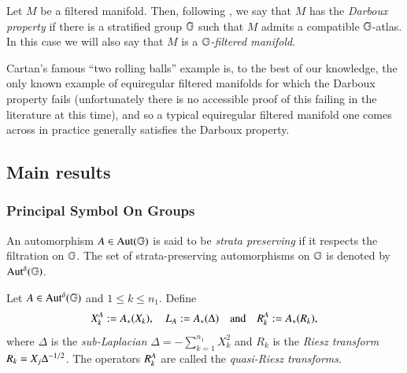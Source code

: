 \documentclass[leqno]{amsart}
\begin{document}
	\begin{definition}\label{G-filtered manifold}
		Let $M$ be a filtered manifold. Then, following \cite{MK2022}, we say that $M$ has the \textit{Darboux property} if there is a stratified group $\mathbb{G}$ such that $M$ admits a compatible $\mathbb{G}$-atlas. In this case we will also say that $M$ is a \textit{$\mathbb{G}$-filtered manifold}.
	\end{definition}
	
	Cartan's famous ``two rolling balls'' example \cite{balls} is, to the best of our knowledge, the only known example of equiregular filtered manifolds for which the Darboux property fails (unfortunately there is no accessible proof of this failing in the literature at this time), and so a typical equiregular filtered manifold one comes across in practice generally satisfies the Darboux property.
	
	
	\subsection{Main results}\label{main results}
	
	\subsubsection{Principal Symbol On Groups}
	
	
	\begin{definition}
		An automorphism $A\in\rm Aut(\mathbb{G})$ is said to be \textit{strata preserving} if it respects the filtration on $\mathbb{G}$. The set of strata-preserving automorphisms on $\mathbb{G}$ is denoted by ${\rm Aut^{\delta}}(\mathbb{G})$.
	\end{definition}
	
	\begin{definition}\label{XALARA}
		Let $A\in{\rm Aut^{\delta}}(\mathbb{G})$ and $1\leq k\leq n_1$. Define
		$$X_k^A:=A_*(X_k),\quad L_A:=A_*(\Delta)\quad\text{and}\quad { R}^{A}_{k} :=A_*({ R}_k),$$
		where $\Delta$ is the \textit{sub-Laplacian} $\displaystyle{\Delta=-\sum_{k=1}^{n_{1}}X_{k}^{2}}$ and $R_k$ is the \textit{Riesz transform} ${ R}_k=X_j\Delta^{-1/2}$. The operators ${ R}^{A}_{k}$ are called the \textit{quasi-Riesz transforms}.
	\end{definition}
	
\end{document}
